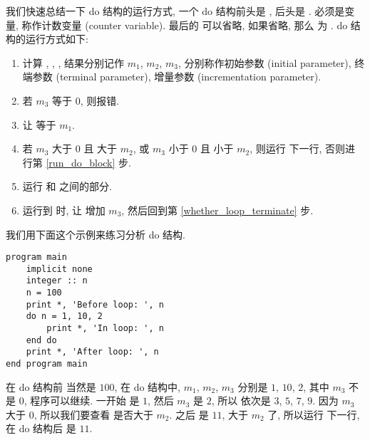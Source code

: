 我们快速总结一下 do 结构的运行方式, 一个 do 结构前头是 , 后头是 . \ttt{[m]} 必须是变量, 称作计数变量 (counter variable). 最后的 \ttt{, [m3]} 可以省略, 如果省略, 那么 \ttt{[m3]} 为 . do 结构的运行方式如下:
\begin{enumerate}
    \item 计算 \ttt{[m1]}, \ttt{[m2]}, \ttt{[m3]}, 结果分别记作 $m_1$, $m_2$, $m_3$, 分别称作初始参数 (initial parameter), 终端参数 (terminal parameter), 增量参数 (incrementation parameter).\label{calculate_loop_parameter}
    \item 若 $m_3$ 等于 $0$, 则报错.
    \item 让 \ttt{[m]} 等于 $m_1$.
    \item 若 $m_3$ 大于 $0$ 且 \ttt{[m]} 大于 $m_2$, 或 $m_3$ 小于 $0$ 且 \ttt{[m]} 小于 $m_2$, 则运行  下一行, 否则进行第 \ref{run_do_block} 步.\label{whether_loop_terminate}
    \item 运行  和  之间的部分.\label{run_do_block}
    \item 运行到  时, 让 \ttt{[m]} 增加 $m_3$, 然后回到第 \ref{whether_loop_terminate} 步.
\end{enumerate}
我们用下面这个示例来练习分析 do 结构.
\begin{lstlisting}
program main
    implicit none
    integer :: n
    n = 100
    print *, 'Before loop: ', n
    do n = 1, 10, 2
        print *, 'In loop: ', n
    end do
    print *, 'After loop: ', n
end program main
\end{lstlisting}
在 do 结构前  当然是 $100$, 在 do 结构中, $m_1$, $m_2$, $m_3$ 分别是 $1$, $10$, $2$, 其中 $m_3$ 不是 $0$, 程序可以继续. 一开始  是 $1$, 然后 $m_3$ 是 $2$, 所以  依次是 $3$, $5$, $7$, $9$. 因为 $m_3$ 大于 $0$, 所以我们要查看  是否大于 $m_2$. 之后  是 $11$,  大于 $m_2$ 了, 所以运行  下一行, 在 do 结构后  是 $11$.

